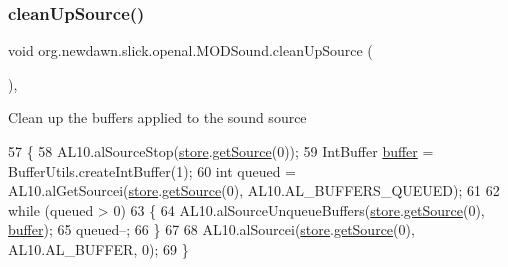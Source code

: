 \subsubsection{\texorpdfstring{clean\+Up\+Source()}{cleanUpSource()}}
{\footnotesize\ttfamily void org.\+newdawn.\+slick.\+openal.\+M\+O\+D\+Sound.\+clean\+Up\+Source (\begin{DoxyParamCaption}{ }\end{DoxyParamCaption})\hspace{0.3cm}{\ttfamily [inline]}, {\ttfamily [private]}}

Clean up the buffers applied to the sound source 
\begin{DoxyCode}
57                                  \{
58         AL10.alSourceStop(\mbox{\hyperlink{classorg_1_1newdawn_1_1slick_1_1openal_1_1_m_o_d_sound_a36ab5f890c0566a6f9b1797fa91fdc7e}{store}}.\mbox{\hyperlink{classorg_1_1newdawn_1_1slick_1_1openal_1_1_sound_store_a36b83b67fccef1cd5167d2ea11e89f6a}{getSource}}(0));
59         IntBuffer \mbox{\hyperlink{classorg_1_1newdawn_1_1slick_1_1openal_1_1_audio_impl_ac08b49601da30895fecfdca4e8ba0049}{buffer}} = BufferUtils.createIntBuffer(1);
60         \textcolor{keywordtype}{int} queued = AL10.alGetSourcei(\mbox{\hyperlink{classorg_1_1newdawn_1_1slick_1_1openal_1_1_m_o_d_sound_a36ab5f890c0566a6f9b1797fa91fdc7e}{store}}.\mbox{\hyperlink{classorg_1_1newdawn_1_1slick_1_1openal_1_1_sound_store_a36b83b67fccef1cd5167d2ea11e89f6a}{getSource}}(0), AL10.AL\_BUFFERS\_QUEUED);
61         
62         \textcolor{keywordflow}{while} (queued > 0)
63         \{
64             AL10.alSourceUnqueueBuffers(\mbox{\hyperlink{classorg_1_1newdawn_1_1slick_1_1openal_1_1_m_o_d_sound_a36ab5f890c0566a6f9b1797fa91fdc7e}{store}}.\mbox{\hyperlink{classorg_1_1newdawn_1_1slick_1_1openal_1_1_sound_store_a36b83b67fccef1cd5167d2ea11e89f6a}{getSource}}(0), \mbox{\hyperlink{classorg_1_1newdawn_1_1slick_1_1openal_1_1_audio_impl_ac08b49601da30895fecfdca4e8ba0049}{buffer}});
65             queued--;
66         \}
67         
68         AL10.alSourcei(\mbox{\hyperlink{classorg_1_1newdawn_1_1slick_1_1openal_1_1_m_o_d_sound_a36ab5f890c0566a6f9b1797fa91fdc7e}{store}}.\mbox{\hyperlink{classorg_1_1newdawn_1_1slick_1_1openal_1_1_sound_store_a36b83b67fccef1cd5167d2ea11e89f6a}{getSource}}(0), AL10.AL\_BUFFER, 0);
69     \}
\end{DoxyCode}
\mbox{\label{classorg_1_1newdawn_1_1slick_1_1openal_1_1_m_o_d_sound_ad3ac36d37787ee920277826347875e4a}} 
